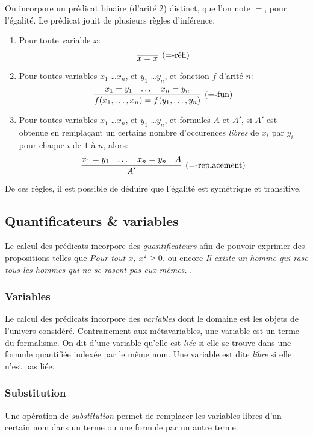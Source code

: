 On incorpore un prédicat binaire (d'arité 2) distinct, que l'on note ${=}$, pour l'égalité.
Le prédicat jouit de plusieurs règles d'inférence.
\begin{enumerate}
\item Pour toute variable $x$:
\[
\infer[({=}\text{-réfl})]{x = x}{}
\]
\item Pour toutes variables $x_1$ \dots $x_n$, et $y_1$ \dots $y_n$, et fonction $f$ d'arité $n$:
\[
\infer[({=}\text{-fun})]{f(x_1, \dots, x_n) = f(y_1, \dots, y_n)}{x_1 = y_1 & \dots & x_n = y_n}
\]
\item Pour toutes variables  $x_1$ \dots $x_n$, et $y_1$ \dots $y_n$, et formules $A$ et $A'$, si $A'$ est obtenue en remplaçant un certains nombre d'occurences \textit{libres} de $x_i$ par $y_i$ pour chaque $i$ de $1$ à $n$, alors:
\[
\infer[({=}\text{-replacement})]{A'}{x_1 = y_1 & \dots & x_n = y_n & A}
\]
\end{enumerate}

De ces règles, il est possible de déduire que l'égalité est symétrique et transitive. 


\subsection{Quantificateurs \& variables}

Le calcul des prédicats incorpore des \og \textit{quantificateurs} \fg{} afin de pouvoir exprimer des propositions telles que \og \textit{Pour tout $x$, $x^2 \geq 0$.} \fg{} ou encore \og \textit{Il existe un homme qui rase tous les hommes qui ne se rasent pas eux-mêmes.} \fg{}.

\subsubsection{Variables}

Le calcul des prédicats incorpore des \og \textit{variables} \fg{} dont le domaine est les objets de l'univers considéré.
Contrairement aux métavariables, une variable est un terme du formalisme.
On dit d'une variable qu'elle est \og \textit{liée} \fg{} si elle se trouve dans une formule quantifiée indexée par le même nom.
Une variable est dite \og \textit{libre} \fg{} si elle n'est pas liée.

\subsubsection{Substitution}

Une opération de \og \textit{substitution} \fg{} permet de remplacer les variables libres d'un certain nom dans un terme ou une formule par un autre terme.

